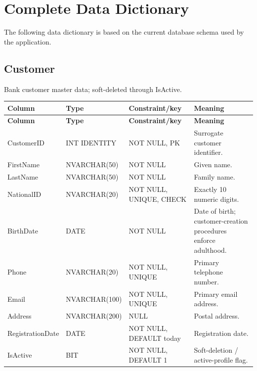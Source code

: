 \documentclass[11pt,a4paper,oneside]{report}
\begin{document}
\chapter{Complete Data Dictionary}
The following data dictionary is based on the current database schema used by the application.

\section{Customer}
Bank customer master data; soft-deleted through IsActive.
\begin{longtable}{L{0.21\textwidth}L{0.18\textwidth}L{0.24\textwidth}L{0.31\textwidth}}
\toprule
\textbf{Column} & \textbf{Type} & \textbf{Constraint/key} & \textbf{Meaning}\\
\midrule\endfirsthead
\toprule\textbf{Column} & \textbf{Type} & \textbf{Constraint/key} & \textbf{Meaning}\\\midrule\endhead
CustomerID & INT IDENTITY & NOT NULL, PK & Surrogate customer identifier.\\
FirstName & NVARCHAR(50) & NOT NULL & Given name.\\
LastName & NVARCHAR(50) & NOT NULL & Family name.\\
NationalID & NVARCHAR(20) & NOT NULL, UNIQUE, CHECK & Exactly 10 numeric digits.\\
BirthDate & DATE & NOT NULL & Date of birth; customer-creation procedures enforce adulthood.\\
Phone & NVARCHAR(20) & NOT NULL, UNIQUE & Primary telephone number.\\
Email & NVARCHAR(100) & NOT NULL, UNIQUE & Primary email address.\\
Address & NVARCHAR(200) & NULL & Postal address.\\
RegistrationDate & DATE & NOT NULL, DEFAULT today & Registration date.\\
IsActive & BIT & NOT NULL, DEFAULT 1 & Soft-deletion / active-profile flag.\\
\bottomrule
\end{longtable}
\end{document}
